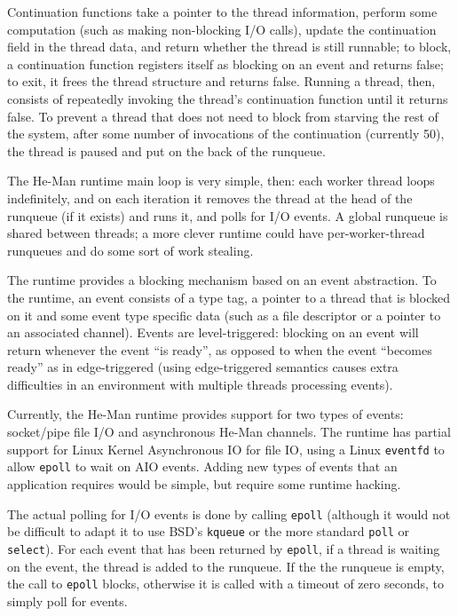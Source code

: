 \documentclass[preprint,10pt]{sigplanconf}
\renewcommand{\t}{\texttt}
\begin{document}
Continuation functions take a pointer to the thread information,
perform some computation (such as making non-blocking I/O calls),
update the continuation field in the thread data, and return whether
the thread is still runnable; to block, a continuation function
registers itself as blocking on an event and returns false; to exit,
it frees the thread structure and returns false.  Running a thread,
then, consists of repeatedly invoking the thread's continuation
function until it returns false. To prevent a thread that does not
need to block from starving the rest of the system, after some number
of invocations of the continuation (currently 50), the thread is
paused and put on the back of the runqueue.

The He-Man runtime main loop is very simple, then: each worker thread
loops indefinitely, and on each iteration it removes the thread at the
head of the runqueue (if it exists) and runs it, and polls for I/O
events. A global runqueue is shared between threads; a more clever
runtime could have per-worker-thread runqueues and do some sort of
work stealing.

The runtime provides a blocking mechanism based on an event
abstraction. To the runtime, an event consists of a type tag, a
pointer to a thread that is blocked on it and some event type specific
data (such as a file descriptor or a pointer to an associated
channel). Events are level-triggered: blocking on an event will return
whenever the event ``is ready'', as opposed to when the event
``becomes ready'' as in edge-triggered (using edge-triggered semantics
causes extra difficulties in an environment with multiple threads
processing events).

Currently, the He-Man runtime provides support for two types of
events: socket/pipe file I/O and asynchronous He-Man channels.  The
runtime has partial support for Linux Kernel Asynchronous IO for file
IO, using a Linux \t{eventfd} to allow \t{epoll} to wait on AIO
events. Adding new types of events that an application requires would
be simple, but require some runtime hacking.

The actual polling for I/O events is done by calling \t{epoll}
(although it would not be difficult to adapt it to use BSD's
\t{kqueue} or the more standard \t{poll} or \t{select}).  For each
event that has been returned by \t{epoll}, if a thread is waiting on
the event, the thread is added to the runqueue. If the the runqueue is
empty, the call to \t{epoll} blocks, otherwise it is called with a
timeout of zero seconds, to simply poll for events.
\end{document}
